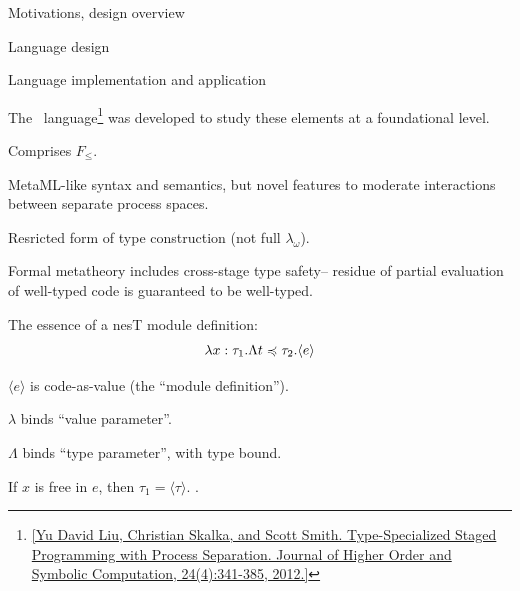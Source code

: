 \stopslide


\begin{cenumerate}
\item Motivations, design overview
\item {}
\begin{citemize}
\item Language design 
\item {}
\end{citemize}
\item Language implementation and application
\end{cenumerate}

\stopslide


The \fml\ language\footnote{\cref{Yu David Liu, Christian Skalka, and Scott Smith. Type-Specialized Staged Programming with Process Separation. Journal of Higher Order and Symbolic Computation, 24(4):341-385, 2012.}} was developed to study these elements at a foundational level.
\begin{citemize}
\item Comprises $F_{\le}$.
\item MetaML-like syntax and semantics, but novel features to moderate 
interactions between separate process spaces.
\item Resricted form of type construction (not full $\lambda_\omega$).
\item Formal metatheory includes cross-stage type safety-- residue of  
partial evaluation of well-typed code is guaranteed to be well-typed.
\end{citemize}

\stopslide


The essence of a nesT module definition:
{\Large
$$
\lambda x : \tau_1 . \Lambda t \preccurlyeq \tau_2 . \langle e \rangle
$$
}
\begin{citemize}
\item $\langle e \rangle$ is code-as-value (the ``module definition'').
\item $\lambda$ binds ``value parameter''.
\item $\Lambda$ binds ``type parameter'', with type bound.
\item If $x$ is free in $e$, then $\tau_1 = \langle \tau \rangle$. .
\end{citemize}
\stopslide

